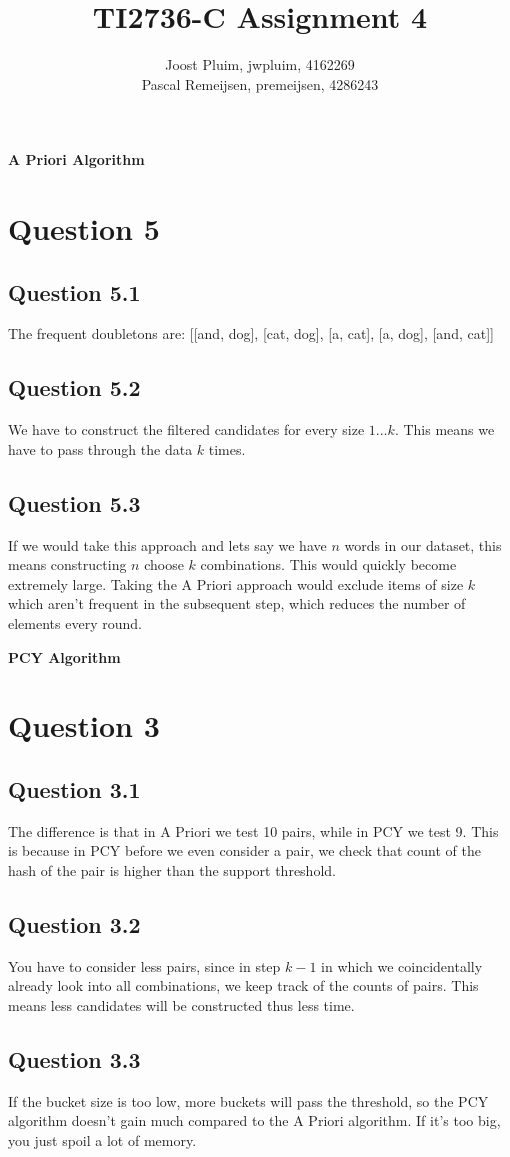 \documentclass[11pt,twoside,a4paper]{article}
\title{TI2736-C Assignment 4}
\author{
	Joost Pluim, jwpluim, 4162269 \\
	Pascal Remeijsen, premeijsen, 4286243
}
\begin{document}
\maketitle
\clearpage

\textbf{A Priori Algorithm}

\section{Question 5}

	\subsection{Question 5.1}
	The frequent doubletons are: [[and, dog], [cat, dog], [a, cat], [a, dog], [and, cat]]
	
	\subsection{Question 5.2}
	We have to construct the filtered candidates for every size $1 \ldots k$. This means we have to pass through the data $k$ times.  
	
	\subsection{Question 5.3}
	If we would take this approach and lets say we have $n$ words in our dataset, this means constructing $n$ choose $k$ combinations. This would quickly become extremely large. Taking the A Priori approach would exclude items of size $k$ which aren't frequent in the subsequent step, which reduces the number of elements every round.

\textbf{PCY Algorithm}
	
\section{Question 3}

	\subsection{Question 3.1}
	The difference is that in A Priori we test 10 pairs, while in PCY we test 9. This is because in PCY before we even consider a pair, we check that count of the hash of the pair is higher than the support threshold.  
	
	\subsection{Question 3.2}
	You have to consider less pairs, since in step $k-1$ in which we coincidentally already look into all combinations, we keep track of the counts of pairs. This means less candidates will be constructed thus less time. 
	
	\subsection{Question 3.3}
	If the bucket size is too low, more buckets will pass the threshold, so the PCY algorithm doesn't gain much compared to the A Priori algorithm. If it's too big, you just spoil a lot of memory. 
	
\begin{thebibliography}{9}
\end{thebibliography}
\end{document}
